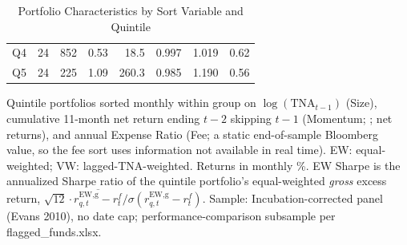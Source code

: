 \begin{table}[!htbp]
{\begin{tabular*}{\linewidth}{@{\extracolsep{\fill}}lrrrrrrr}
\hspace{1em}Q4 & 24 & 852 & 0.53 & 18.5 & 0.997 & 1.019 & 0.62\\
\hspace{1em}Q5 & 24 & 225 & 1.09 & 260.3 & 0.985 & 1.190 & 0.56\\
\bottomrule
\end{tabular*}%
}\sbefit
\fi
\setlength{\tabletempwidth}{\wd\tabletempbox}
\ifdim\tabletempwidth>\linewidth\setlength{\tabletempwidth}{\linewidth}\fi
\begin{minipage}{\tabletempwidth}
\captionsetup{width=\linewidth}
\caption{Portfolio Characteristics by Sort Variable and Quintile}\label{tab:port_characteristics}
\ifdim\wd\tabletempbox>\linewidth
  \resizebox{\linewidth}{!}{\usebox{\tabletempbox}}
\else
  \usebox{\tabletempbox}
\fi
\par\medskip
\begin{singlespace}\tablefont\noindent
Quintile portfolios sorted monthly within group on $\log(\text{TNA}_{t-1})$ (Size), cumulative 11-month net return ending $t-2$ skipping $t-1$ (Momentum; \citealt{JegadeeshTitman1993}; net returns), and annual Expense Ratio (Fee; a static end-of-sample Bloomberg value, so the fee sort uses information not available in real time). EW: equal-weighted; VW: lagged-TNA-weighted. Returns in monthly \%. EW Sharpe is the annualized Sharpe ratio of the quintile portfolio's equal-weighted \textit{gross} excess return, $\sqrt{12}\cdot\overline{r^{\text{EW,g}}_{q,t}-r^{f}_{t}}/\sigma(r^{\text{EW,g}}_{q,t}-r^{f}_{t})$. Sample: Incubation-corrected panel (Evans 2010), no date cap; performance-comparison subsample per flagged\_funds.xlsx.
\end{singlespace}
\end{minipage}
\end{table}

